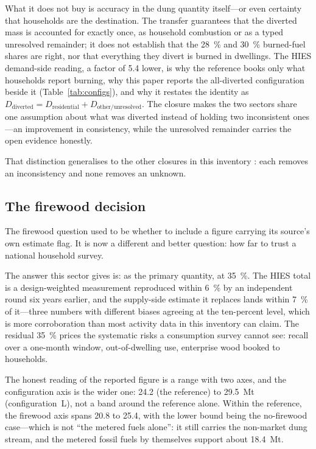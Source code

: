 What it does not buy is accuracy in the dung quantity itself---or even certainty that
households are the destination. The transfer guarantees that the diverted mass is
accounted for exactly once, as household combustion or as a typed unresolved remainder;
it does not establish that the \SI{28}{\percent} and
\SI{30}{\percent} burned-fuel shares are right, nor that everything they divert is burned
in dwellings. The HIES demand-side reading, a factor of \num{5.4} lower, is why the
reference books only what households report burning, why this paper
reports the all-diverted configuration beside it
(Table~\ref{tab:configs}), and why it restates the identity as
$D_{\text{diverted}} = D_{\text{residential}} + D_{\text{other/unresolved}}$. The closure
makes the two sectors share one assumption about what was diverted instead of holding two
inconsistent ones---an
improvement in consistency, while the unresolved remainder carries the open evidence
honestly.

That distinction generalises to the other closures in this inventory
\citep{ahmad2026national}: each removes an inconsistency and none removes an unknown.

\subsection{The firewood decision}

The firewood question used to be whether to include a figure carrying its source's own
estimate flag. It is now a different and better question: how far to trust a national
household survey.

The answer this sector gives is: as the primary quantity, at \SI{35}{\percent}. The HIES
total is a design-weighted measurement reproduced within \SI{6}{\percent} by an independent
round six years earlier, and the supply-side estimate it replaces lands within
\SI{7}{\percent} of it---three numbers with different biases agreeing at the ten-percent
level, which is more corroboration than most activity data in this inventory can claim. The
residual \SI{35}{\percent} prices the systematic risks a consumption survey cannot see:
recall over a one-month window, out-of-dwelling use, enterprise wood booked to households.

The honest reading of the reported figure is a range with two axes, and the
configuration axis is the wider one: \SI{24.2}{} (the reference) to
\SI{29.5}{\mega\tonne} (configuration~L), not a band
around the reference alone. Within the reference, the firewood axis spans \SI{20.8}{} to
\SI{25.4}{}, with the lower bound being the no-firewood case---which is not ``the
metered fuels alone'': it still carries the non-market dung stream, and the metered
fossil fuels by themselves support about \SI{18.4}{\mega\tonne}.


